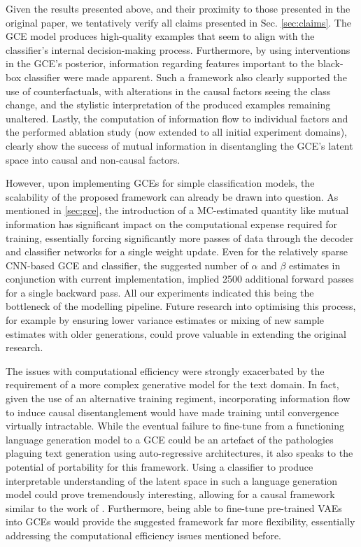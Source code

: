 Given the results presented above, and their proximity to those presented in the original paper, we tentatively verify all claims presented in Sec. \ref{sec:claims}. The GCE model produces high-quality examples that seem to align with the classifier's internal decision-making process. Furthermore, by using interventions in the GCE's posterior, information regarding features important to the black-box classifier were made apparent. Such a framework also clearly supported the use of counterfactuals, with alterations in the causal factors seeing the class change, and the stylistic interpretation of the produced examples remaining unaltered. Lastly, the computation of information flow to individual factors and the performed ablation study (now extended to all initial experiment domains), clearly show the success of mutual information in disentangling the GCE's latent space into causal and non-causal factors.

However, upon implementing GCEs for simple classification models, the scalability of the proposed framework can already be drawn into question. As mentioned in \ref{sec:gce}, the introduction of a MC-estimated quantity like mutual information has significant impact on the computational expense required for training, essentially forcing significantly more passes of data through the decoder and classifier networks for a single weight update. Even for the relatively sparse CNN-based GCE and classifier, the suggested number of $\alpha$ and $\beta$ estimates in conjunction with current implementation, implied 2500 additional forward passes for a single backward pass. All our experiments indicated this being the bottleneck of the modelling pipeline. Future research into optimising this process, for example by ensuring lower variance estimates or mixing of new sample estimates with older generations, could prove valuable in extending the original research.

The issues with computational efficiency were strongly exacerbated by the requirement of a more complex generative model for the text domain. In fact, given the use of an alternative training regiment, incorporating information flow to induce causal disentanglement would have made training until convergence virtually intractable. While the eventual failure to fine-tune from a functioning language generation model to a GCE could be an artefact of the pathologies plaguing text generation using auto-regressive architectures, it also speaks to the potential of portability for this framework. Using a classifier to produce interpretable understanding of the latent space in such a language generation model could prove tremendously interesting, allowing for a causal framework similar to the work of \cite{hu2017toward}. Furthermore, being able to fine-tune pre-trained VAEs into GCEs would provide the suggested framework far more flexibility, essentially addressing the computational efficiency issues mentioned before. 

